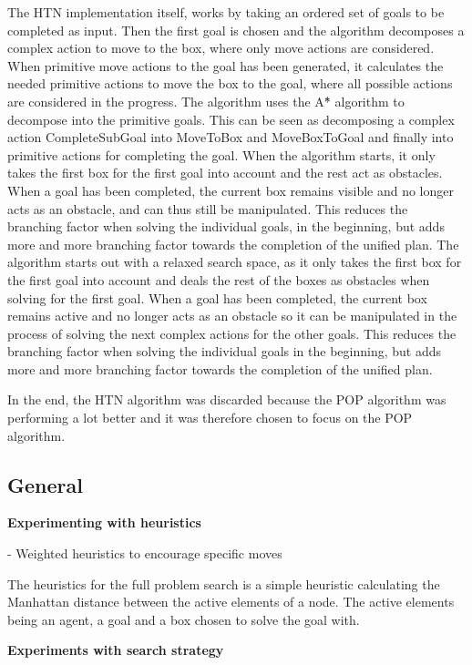 \documentclass[Main]{subfiles}
\begin{document}
The HTN implementation itself, works by taking an ordered set of goals to be completed as input. Then the first goal is chosen and the algorithm decomposes a complex action to move to the box, where only move actions are considered. When primitive move actions to the goal has been generated, it calculates the needed primitive actions to move the box to the goal, where all possible actions are considered in the progress. The algorithm uses the A\^{*} algorithm to decompose into the primitive goals.
This can be seen as decomposing a complex action CompleteSubGoal into MoveToBox and MoveBoxToGoal and finally into primitive actions for completing the goal.
When the algorithm starts, it only takes the first box for the first goal into account and the rest act as obstacles. When a goal has been completed, the current box remains visible and no longer acts as an obstacle, and can thus still be manipulated. This reduces the branching factor when solving the individual goals, in the beginning, but adds more and more branching factor towards the completion of the unified plan.
The algorithm starts out with a relaxed search space, as it only takes the first box for the first goal into account and deals the rest of the boxes as obstacles when solving for the first goal.
When a goal has been completed, the current box remains active and no longer acts as an obstacle so it can be manipulated in the process of solving the next complex actions for the other goals.
This reduces the branching factor when solving the individual goals in the beginning, but adds more and more branching factor towards the completion of the unified plan.

In the end, the HTN algorithm was discarded because the POP algorithm was performing a lot better and it was therefore chosen to focus on the POP algorithm.


\subsection{General}


\textbf{Experimenting with heuristics}

- Weighted heuristics to encourage specific moves

The heuristics for the full problem search is a simple heuristic calculating the Manhattan distance between the active elements of a node. The active elements being an agent, a goal and a box chosen to solve the goal with. 




\textbf{Experiments with search strategy}
\end{document}
